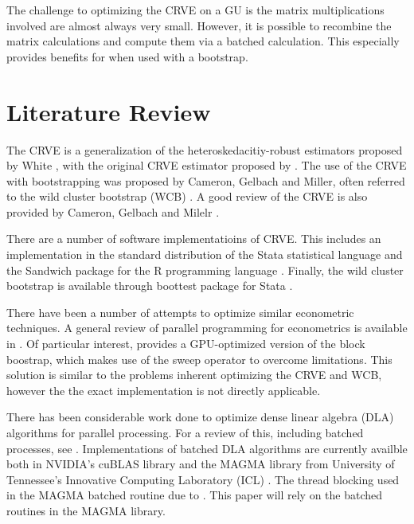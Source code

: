 \documentclass[11pt]{article}       %
\begin{document}
The challenge to optimizing the CRVE on a GU is the matrix multiplications involved are almost always very small. However, it is possible to recombine the matrix calculations and compute them via a batched calculation. This especially provides benefits for when used with a bootstrap.

\section{Literature Review} \label{litrev}

The CRVE is a generalization of the heteroskedacitiy-robust estimators proposed by White \cite{white1980hc}, with the original CRVE estimator proposed by \cite{froot1989consistent}. The use of the CRVE with bootstrapping was proposed by Cameron, Gelbach and Miller, often referred to the wild cluster bootstrap (WCB) \cite{cameron2008bootstrap}. A good review of the CRVE is also provided by Cameron, Gelbach and Milelr \cite{cameron2010robust}.

There are a number of software implementatioins of CRVE. This includes an implementation in the standard distribution of the Stata statistical language \cite{rogers1994regression} and the Sandwich package for the R programming language \cite{zeileis2004sandwitch}. Finally, the wild cluster bootstrap is available through boottest package for Stata \cite{roodman2015boottest}.

There have been a number of attempts to optimize similar econometric techniques. A general review of parallel programming for econometrics is available in \cite{guo2012econgpu}. Of particular interest, \cite{lopez2016gpu} provides a GPU-optimized version of the block boostrap, which makes use of the sweep operator to overcome limitations. This solution is similar to the problems inherent optimizing the CRVE and WCB, however the the exact implementation is not directly applicable.

There has been considerable work done to optimize dense linear algebra (DLA) algorithms for parallel processing. For a review of this, including batched processes, see \cite{dongarra2016parallel}. Implementations of batched DLA algorithms are currently availble both in NVIDIA's cuBLAS library \cite{nvidia2013basic} and the MAGMA library from University of Tennessee's Innovative Computing Laboratory (ICL) \cite{agullo2009numerical}. The thread blocking used in the MAGMA batched routine due to \cite{nath2010improved}. This paper will rely on the batched routines in the MAGMA library.
\end{document}
